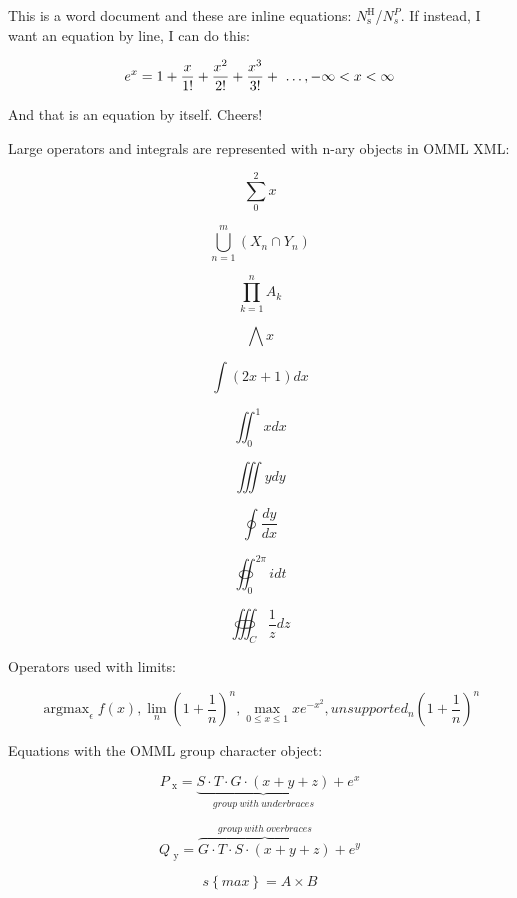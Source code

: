 \documentclass[11pt,a4paper]{article}
\begin{document}
This is a word document and these are inline equations: $N_{\text{s}}^{\text{H}}$/$N_{s}^{P}$​. If instead, I want an equation by line, I can do this:

$$e^{x}=1+\frac{x}{1!}+\frac{x^{2}}{2!}+\frac{x^{3}}{3!}+ \text{ \textellipsis } , - \infty  < x <  \infty$$

And that is an equation by itself. Cheers!

Large operators and integrals are represented with n-ary objects in OMML XML:

$$\sum_{0}^{2}x$$

$$\bigcup_{n=1}^{m}\left(X_{n} \cap Y_{n}\right)$$

$$\prod_{k=1}^{n}A_{k}$$

$$\bigwedge x$$

$$\int(2x+1)dx$$

$$\iint_{0}^{1}xdx$$

$$\iiint ydy$$

$$\oint\frac{dy}{dx}$$

$$\oiint_{0}^{2 \pi }idt$$

$$\oiiint_{C}^{}\frac{1}{z}dz$$

Operators used with limits:

$$\operatorname{argmax}_{ \epsilon}f(x),   \lim_{n}{\left(1+\frac{1}{n}\right)}^{n} ,  \max_{0 \leq x \leq 1}xe^{-x^{2}},  unsupported_{n}{\left(1+\frac{1}{n}\right)}^{n}$$

Equations with the OMML group character object:

$$P_{\text{ x}}=\underbrace{S \cdot T \cdot G \cdot (x+y+z)}_{group\ with\ underbraces}+e^{x}$$

$$Q_{\text{ y}}=\overset{group\ with\ overbraces}{\overbrace{G \cdot T \cdot S \cdot (x+y+z)}}+e^{y}$$

$$s\left\{max\right\}= A \times B$$
\end{document}
